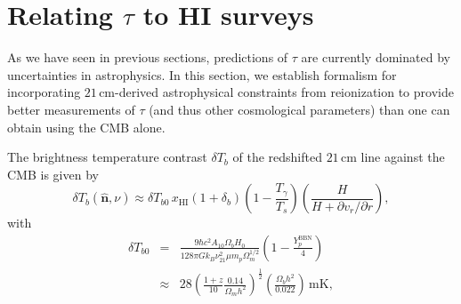 \documentclass[twocolumn,aps,prd,nofootinbib,showpacs,superscriptaddress]{revtex4-1}
\begin{document}
\section{Relating $\tau$ to HI surveys}
\label{eq:Pkformalism}

As we have seen in previous sections, predictions of $\tau$ are currently dominated by uncertainties in astrophysics. In this section, we establish formalism for incorporating $21\,\textrm{cm}$-derived astrophysical constraints from reionization to provide better measurements of $\tau$ (and thus other cosmological parameters) than one can obtain using the CMB alone.

The brightness temperature contrast $\delta T_b$ of the redshifted $21\,\textrm{cm}$ line against the CMB is given by \cite{furlanetto_et_al2006,aviBook}
\begin{equation}
\label{eq:deltaTdef}
\delta T_b(\mathbf{\hat{n}}, \nu) \approx \delta T_{b0}\, x_\textrm{HI}  (1 + \delta_b) \left( 1 - \frac{T_\gamma}{T_s}\right)\!\left( \frac{H}{H+ \partial v_r / \partial r} \right),
\end{equation}
with
\begin{eqnarray}
\label{eq:TbPrefactor}
\delta T_{b0} &=&  \frac{9\hbar c^2 A_{10}\Omega_b H_0}{128 \pi G k_B \nu_{21}^2 \mu m_p\Omega_m^{1/2}} \left(1 - \frac{Y_p^\textrm{BBN}}{4} \right) \nonumber \\
&\approx& 28 \left( \frac{1+z}{10} \frac{0.14}{\Omega_m h^2} \right)^\frac{1}{2} \left( \frac{\Omega_b h^2}{0.022}\right)\,\textrm{mK},
\end{eqnarray}
\end{document}
